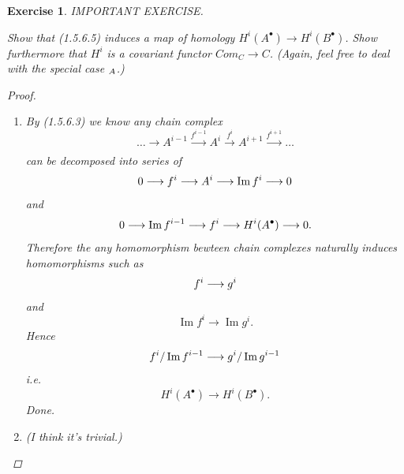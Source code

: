 \documentclass{article}
\theoremstyle{breakstyle}
\newtheorem{exercise}{Exercise}[section]
\let\ker\relax
\DeclareMathOperator{\ker}{Ker}
\DeclareMathOperator{\im}{Im}
\let\mod\relax
\DeclareMathOperator{\mod}{Mod}
\begin{document}
\begin{exercise}
IMPORTANT EXERCISE.

Show that (1.5.6.5) induces a map of homology $H^{i}(A^{\bullet}) \to
H^{i}(B^{\bullet})$. Show furthermore that $H^{i}$ is a covariant functor
$Com_{C} \to C$. (Again, feel free to deal with the special case
$\mod_{A}$.)

\begin{proof}
    \begin{enumerate}[label=({\roman*})]
        \item 
            By (1.5.6.3) we know any chain complex
            $$
            \ldots \longrightarrow A^{i-1}\xrightarrow[]{f^{i-1}}
            A^{i}\xrightarrow[]{f^{i}}A^{i+1}\xrightarrow[]{f^{i+1}} \ldots 
            $$
            can be decomposed into series of 
            $$
            0\longrightarrow \ker{f^{i}}\longrightarrow A^{i}\longrightarrow
            \im{f^{i}}\longrightarrow 0
            $$
            and
            $$
            0\longrightarrow \im{f^{i-1}}\longrightarrow
            \ker{f^{i}}\longrightarrow H^{i}(A^{\bullet })\longrightarrow 0
            .$$
            Therefore the any homomorphism bewteen chain complexes naturally
            induces homomorphisms such as
            $$
            \ker{f^{i}}\longrightarrow \ker{g^{i}}
            $$
            and
            $$
            \im{f^{i}}\longrightarrow \im{g^{i}}
            .$$
            Hence
            $$
            \ker{f^{i}}/\im{f^{i-1}}\longrightarrow \ker{g^{i}}/\im{g^{i-1}}
            $$
            i.e.
            $$
            H^{i}(A^{\bullet })\longrightarrow H^{i}(B^{\bullet })
            .$$
            Done.
        \item 
            \emph{(I think it's trivial.)}
    \end{enumerate}
\end{proof}

\end{exercise}
\end{document}
